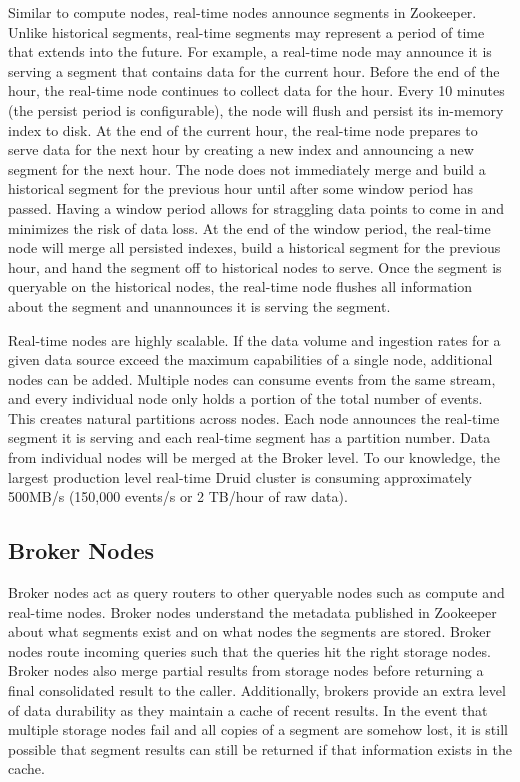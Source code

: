 \documentclass{vldb}
\begin{document}
Similar to compute nodes, real-time nodes announce segments in
Zookeeper. Unlike historical segments, real-time segments may
represent a period of time that extends into the future. For example,
a real-time node may announce it is serving a segment that contains
data for the current hour. Before the end of the hour, the real-time
node continues to collect data for the hour. Every 10 minutes (the
persist period is configurable), the node will flush and persist its
in-memory index to disk. At the end of the current hour, the real-time
node prepares to serve data for the next hour by creating a new index
and announcing a new segment for the next hour. The node does not
immediately merge and build a historical segment for the previous hour
until after some window period has passed. Having a window period
allows for straggling data points to come in and minimizes the risk of
data loss. At the end of the window period, the real-time node will
merge all persisted indexes, build a historical segment for the
previous hour, and hand the segment off to historical nodes to
serve. Once the segment is queryable on the historical nodes, the
real-time node flushes all information about the segment and
unannounces it is serving the segment.

Real-time nodes are highly scalable. If the data volume and ingestion
rates for a given data source exceed the maximum capabilities of a
single node, additional nodes can be added.  Multiple nodes can
consume events from the same stream, and every individual node only
holds a portion of the total number of events.  This creates natural
partitions across nodes. Each node announces the real-time segment it
is serving and each real-time segment has a partition number.  Data
from individual nodes will be merged at the Broker level.  To our
knowledge, the largest production level real-time Druid cluster is
consuming approximately 500MB/s (150,000 events/s or 2 TB/hour of raw data).

\subsection{Broker Nodes}
Broker nodes act as query routers to other queryable nodes such as
compute and real-time nodes. Broker nodes understand the metadata
published in Zookeeper about what segments exist and on what nodes the
segments are stored. Broker nodes route incoming queries such that the queries hit
the right storage nodes. Broker nodes also merge partial results from
storage nodes before returning a final consolidated result to the
caller.  Additionally, brokers provide an extra level of data
durability as they maintain a cache of recent results. In the event
that multiple storage nodes fail and all copies of a segment are
somehow lost, it is still possible that segment results can still be
returned if that information exists in the cache.
\end{document}
